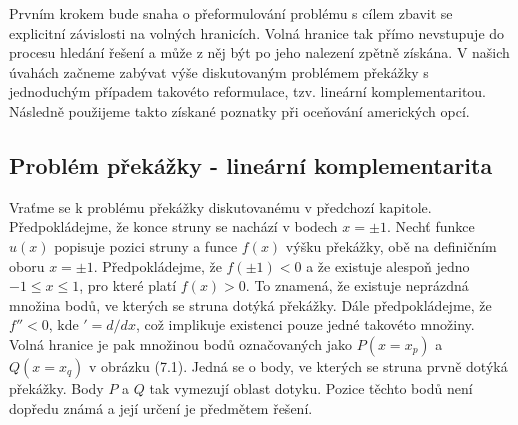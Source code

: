 \documentclass[a4paper]{book}
\begin{document}
Prvním krokem bude snaha o přeformulování problému s cílem zbavit se explicitní závislosti na volných hranicích. Volná hranice tak přímo nevstupuje do procesu hledání řešení a může z něj být po jeho nalezení zpětně získána. V našich úvahách začneme zabývat výše diskutovaným problémem překážky s jednoduchým případem takovéto reformulace, tzv. lineární komplementaritou. Následně použijeme takto získané poznatky při oceňování amerických opcí.

\subsection{Problém překážky - lineární komplementarita}

Vraťme se k problému překážky diskutovanému v předchozí kapitole. Předpokládejme, že konce struny se nachází v bodech $x = \pm 1$. Nechť funkce $u(x)$ popisuje pozici struny a funce $f(x)$ výšku překážky, obě na definičním oboru $x = \pm 1$.
Předpokládejme, že $f(\pm1) < 0$ a že existuje alespoň jedno $-1 \le x \le 1$, pro které platí $f(x) > 0$. To znamená, že existuje neprázdná množina bodů, ve kterých se struna dotýká překážky. Dále předpokládejme, že $f'' < 0$, kde $' = d/dx$, což implikuje existenci pouze jedné takovéto množiny. Volná hranice je pak množinou bodů označovaných jako $P(x = x_p)$ a $Q(x = x_q)$ v obrázku (7.1). Jedná se o body, ve kterých se struna prvně dotýká překážky. Body $P$ a $Q$ tak vymezují oblast dotyku. Pozice těchto bodů není dopředu známá a její určení je předmětem řešení.
\end{document}
